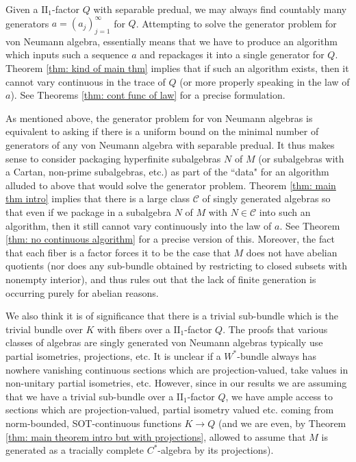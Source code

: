\documentclass[10pt]{amsart}
\theoremstyle{definition}
\numberwithin{equation}{section}
\begin{document}
Given a $\textrm{II}_{1}$-factor $Q$ with separable predual, we may always find countably many generators $a=(a_{j})_{j=1}^{\infty}$ for $Q$. Attempting to solve the generator problem for von Neumann algebra, essentially means that we have to produce an algorithm which inputs such a sequence $a$ and repackages it into a single generator for $Q$. Theorem \ref{thm: kind of main thm} implies that if such an algorithm exists, then it cannot vary continuous in the trace of $Q$ (or more properly speaking in the law of $a$). See Theorems \ref{thm: cont func of law} for a precise formulation.

As mentioned above, the generator problem for von Neumann algebras is equivalent to asking if there is a uniform bound on the minimal number of generators of any von Neumann algebra with separable predual. 
It thus makes sense to consider packaging hyperfinite subalgebras $N$ of $M$ (or subalgebras with a Cartan, non-prime subalgebras, etc.) as part of the ``data" for an algorithm alluded to above that would solve the generator problem. Theorem \ref{thm: main thm intro} implies that there is a large class $\mathcal{C}$ of singly generated algebras so that even if we package in  a subalgebra $N$ of $M$ with $N\in \mathcal{C}$ into such an algorithm, then it still cannot vary continuously into the law of $a$. See Theorem \ref{thm: no continuous algorithm} for a precise version of this.  Moreover, the fact that each fiber is a factor forces it to be the case that $M$ does not have abelian quotients (nor does any sub-bundle obtained by restricting to closed subsets with nonempty interior), and thus rules out that the lack of finite generation is occurring purely for abelian reasons.

We also think it is of significance that there is a trivial sub-bundle which is the trivial bundle over $K$ with fibers over a $\textrm{II}_{1}$-factor $Q$. The proofs that various classes of algebras are singly generated von Neumann algebras typically use partial isometries, projections, etc. It is unclear if a $W^{*}$-bundle always has nowhere vanishing continuous sections which are projection-valued, take values in non-unitary partial isometries, etc. However, since in our results we are assuming that we have a trivial sub-bundle over a $\textrm{II}_{1}$-factor $Q$, we have ample access to sections which are projection-valued, partial isometry valued etc. coming from norm-bounded, SOT-continuous functions $K\to Q$ (and we are even, by Theorem \ref{thm: main theorem intro but with projections}, allowed to assume that $M$ is generated as a tracially complete $C^{*}$-algebra by its projections). 
\end{document}
